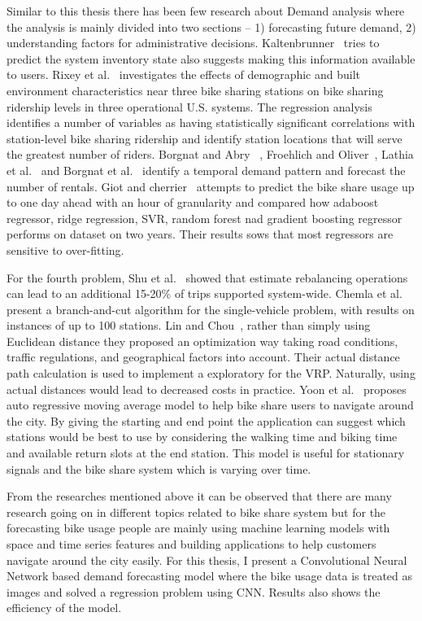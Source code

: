 Similar to this thesis there has been few research about Demand analysis where the analysis is mainly divided into two sections – 1) forecasting future demand, 2) understanding factors for administrative decisions. Kaltenbrunner~\cite{kaltenbrunner2010urban} tries to predict the system inventory state also suggests making this information available to users. Rixey et al.~\cite{rixey2013station} investigates the effects of demographic and built environment characteristics near three bike sharing stations on bike sharing ridership levels in three operational U.S. systems. The regression analysis identifies a number of variables as having statistically significant correlations with station-level bike sharing ridership and identify station locations that will serve the greatest number of riders. Borgnat and Abry~\cite{borgnat2011shared} , Froehlich and Oliver~\cite{froehlich2008measuring}, Lathia et al.~\cite{lathia2012measuring} and Borgnat et al.~\cite{borgnat2009studying} identify a temporal demand pattern and forecast the number of rentals. Giot and cherrier~\cite{giot2014predicting} attempts to predict the bike share usage up to one day ahead with an hour of granularity and compared how adaboost regressor, ridge regression, SVR, random forest nad gradient boosting regressor performs on dataset on two years. Their results sows that most regressors are sensitive to over-fitting. 

For the fourth problem, Shu et al.~\cite{shu2010bicycle} showed that estimate rebalancing operations can lead to an additional 15-20\% of trips supported system-wide. Chemla et al.~\cite{chemla2013bike} present a branch-and-cut algorithm for the single-vehicle problem, with results on instances of up to 100 stations. Lin and Chou~\cite{lin2012geo}, rather than simply using Euclidean distance they proposed an optimization way taking road conditions, traffic regulations, and geographical factors into account. Their actual distance path calculation is used to implement a exploratory for the VRP. Naturally, using actual distances would lead to decreased costs in practice. Yoon et al.~\cite{yoon2012cityride} proposes auto regressive moving average model to help bike share users to navigate around the city. By giving the starting and end point the application can suggest which stations would be best to use by considering the walking time and biking time and available return slots at the end station. This model is useful for stationary signals and the bike share system which is varying over time.  

From the researches mentioned above it can be observed that there are many research going on in different topics related to bike share system but for the forecasting bike usage people are mainly using machine learning models with space and time series features and building applications to help customers navigate around the city easily. 
For this thesis, I present a Convolutional Neural Network based demand forecasting model where the bike usage data is treated as images and solved a regression problem using CNN. Results also shows the efficiency of the model. 



